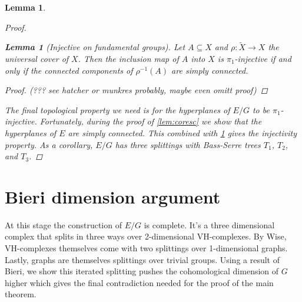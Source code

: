 \documentclass[12pt,parskip=full]{report}
\theoremstyle{plain}
\newtheorem{lem}[thm]{Lemma}
\theoremstyle{definition}
\begin{document}
\begin{lem}
\begin{proof}
    
        
        \begin{lem}
            [Injective on fundamental groups]
            \label{lem:injpi1}
            Let \(A\subseteq X\) and \(\rho:\widetilde X\to X\) the universal cover of \(X\). Then the inclusion map of \(A\) into \(X\) is \(\pi_1\)-injective if and only if the connected components of \(\rho^{-1}(A)\) are simply connected.
            \begin{proof}
                (??? see hatcher or munkres probably, maybe even omitt proof)
            \end{proof}
        \end{lem}
        
        The final topological property we need is for the hyperplanes of \(E/G\) to be \(\pi_1\)-injective. Fortunately, during the proof of \ref{lem:coresc} we show that the hyperplanes of \(E\) are simply connected. This combined with \ref{lem:injpi1} gives the injectivity property. As a corollary, \(E/G\) has three splittings  with Bass-Serre trees \(T_1\), \(T_2\), and \(T_3\).

    \end{proof}
\end{lem}


\section{Bieri dimension argument}

At this stage the construction of \(E/G\) is complete. It's a three dimensional complex that splits in three ways over 2-dimensional VH-complexes. By Wise, VH-complexes themselves come with two splittings over 1-dimensional graphs. Lastly, graphs are themselves splittings over trivial groups. Using a result of Bieri, we show this iterated splitting pushes the cohomological dimension of \(G\) higher which gives the final contradiction needed for the proof of the main theorem.
\end{document}
